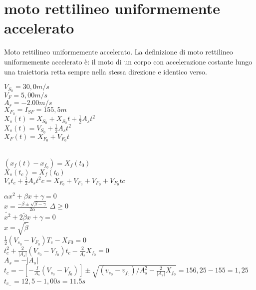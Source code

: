 \documentclass{book}
\begin{document}
\section{moto rettilineo uniformemente accelerato}
Moto rettilineo uniformemente accelerato. La definizione di moto rettilineo uniformemente accelerato è: il moto di un corpo con accelerazione costante lungo una traiettoria retta sempre nella stessa direzione e identico verso.
\begin{multicols}{3} 
$V_{S_0}=30,0m/s$\\
$V_F=5,00m/s$\\
$A_s=-2.00m/s$\\
$X_{F_0}=I_{SF}=155,5m$\\
$X_s(t)=X_{S_0}+X_{S_0}t+\frac{1}{2}A_st^2$\\
$X_s(t)=V_{S_0}+\frac{1}{2}A_st^2$\\
$X_F(t)=X_{F_0}+V_{F_0}t$
\end{multicols}
\begin{multicols}{2} 
\\
  $(x_f(t)-x_{f_0})=X_{f}(t_0)$\\
  $X_s(t_c)=X_f(t_0)$\\
  $V_st_e+\frac{1}{2}A_st^2c=X_{F_0}+V_{F_0}+V_{F_0}+V_{F_0}tc$
\end{multicols}
$\alpha{x^2}+\beta{x}+\gamma=0$\\
$x=\frac{-\beta\pm\sqrt{\beta-\gamma}}{2\alpha}$ $\Delta\geq 0$\\
$\tilde{x^2}+\tilde{2\beta x}+\gamma=0$\\
$x=\sqrt{\tilde{\beta}}$\\
$\frac{1}{2}(V_{s_0}-V_{F_0})T_c-X_{F0}=0$\\
$t^2_c+\frac{2}{|A_s|}(V_{s_0}-V_{f_0})t_c-\frac{2}{A_s}X_{f_0}=0$\\
$A_s=-|A_s|$\\
$t_c=-[-\frac{I}{A_s}(V_{s_0}-V_{f_0})]\pm\sqrt{(v_{s_0}-v_{f_0})/A^2_s-\frac{2}{|A_s|}X_{f_0}}=156,25-155=1,25$\\
$t_{c_-}=12,5-1,00s=11.5s$
\end{document}
